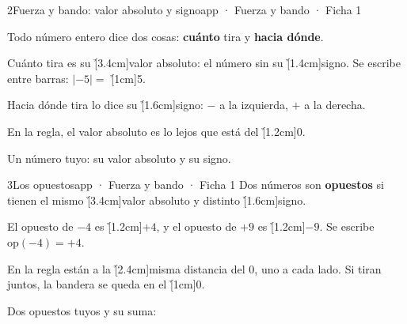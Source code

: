 \documentclass[12pt]{article}
\begin{document}
\begin{cromo}{2}{Fuerza y bando: valor absoluto y signo}{app · Fuerza y bando · Ficha 1}
\begin{minipage}[c]{.72\linewidth}\raggedright
\completa Todo número entero dice dos cosas: \textbf{cuánto} tira y \textbf{hacia dónde}.\par\vspace{2mm}
Cuánto tira es su \h[3.4cm]{valor absoluto}: el número sin su \h[1.4cm]{signo}.
Se escribe entre barras: $|{-5}| =$ \h[1cm]{5}.\par\vspace{2mm}
Hacia dónde tira lo dice su \h[1.6cm]{signo}: $-$ a la izquierda, $+$ a la derecha.\par\vspace{2mm}
En la regla, el valor absoluto es lo lejos que está del \h[1.2cm]{0}.
\end{minipage}%
\begin{minipage}[c]{.28\linewidth}\centering{}\end{minipage}

\vspace{2mm}
\tuejemplo Un número tuyo: su valor absoluto y su signo.
\end{cromo}

\begin{cromo}{3}{Los opuestos}{app · Fuerza y bando · Ficha 1}
\completa Dos números son \textbf{opuestos} si tienen el mismo \h[3.4cm]{valor absoluto} y distinto \h[1.6cm]{signo}.\par\vspace{2mm}
El opuesto de $-4$ es \h[1.2cm]{$+4$}, y el opuesto de $+9$ es \h[1.2cm]{$-9$}. Se escribe $\text{op}(-4) = +4$.\par\vspace{2mm}
En la regla están a la \h[2.4cm]{misma distancia} del 0, uno a cada lado. Si tiran juntos, la bandera se queda en el \h[1cm]{0}.

\vspace{2mm}
\centerline{}

\vspace{1mm}
\tuejemplo Dos opuestos tuyos y su suma:
\end{cromo}
\end{document}
